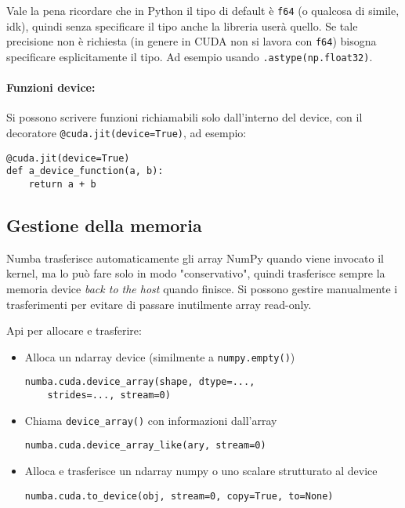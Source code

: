 Vale la pena ricordare che in Python il tipo di default è \texttt{f64} (o qualcosa di simile, idk), quindi senza specificare il tipo anche la libreria userà quello. Se tale precisione non è richiesta (in genere in CUDA non si lavora con \texttt{f64}) bisogna specificare esplicitamente il tipo. Ad esempio usando \texttt{.astype(np.float32)}.

\paragraph{Funzioni device:} Si possono scrivere funzioni richiamabili solo dall'interno del device, con il decoratore \texttt{@cuda.jit(device=True)}, ad esempio:
\begin{verbatim}
@cuda.jit(device=True)
def a_device_function(a, b):
    return a + b
\end{verbatim}

\subsection{Gestione della memoria}

Numba trasferisce automaticamente gli array NumPy quando viene invocato il kernel, ma lo può fare solo in modo "conservativo", quindi trasferisce sempre la memoria device \textit{back to the host} quando finisce. Si possono gestire manualmente i trasferimenti per evitare di passare inutilmente array read-only.

Api per allocare e trasferire:
\begin{itemize}
	\item Alloca un ndarray device (similmente a \texttt{numpy.empty()})
	\begin{verbatim}
numba.cuda.device_array(shape, dtype=..., 
    strides=..., stream=0)
	\end{verbatim}
	
	\item Chiama \texttt{device\_array()} con informazioni dall'array
	\begin{verbatim}
numba.cuda.device_array_like(ary, stream=0)
	\end{verbatim}
	
	\item Alloca e trasferisce un ndarray numpy o uno scalare strutturato al device
	\begin{verbatim}
numba.cuda.to_device(obj, stream=0, copy=True, to=None)
	\end{verbatim}
\end{itemize}

